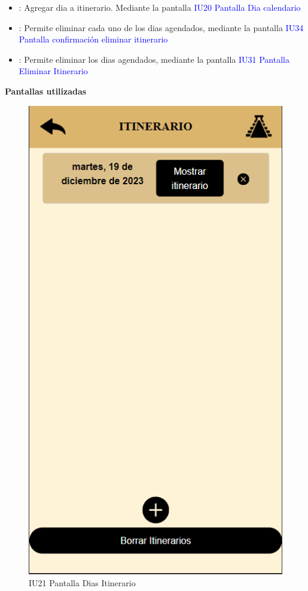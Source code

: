 \begin{itemize}
    \item \fbox{+}: Agregar dia a itinerario. Mediante la pantalla \textcolor{blue}{ IU20 Pantalla Dia calendario}
    
    \item {}: Permite eliminar cada uno de los dias agendados, mediante la pantalla \textcolor{blue}{IU34 Pantalla confirmación eliminar itinerario}
    \item {}: Permite eliminar los dias agendados, mediante la pantalla \textcolor{blue}{ IU31 Pantalla Eliminar Itinerario}
\end{itemize}

\textbf{Pantallas utilizadas}
\begin{figure}[htbp]
    \centering 
        \includegraphics[width=.5\linewidth]{entregable final/pantallasSistema/IU21 Pantalla Dias Itinerario.png}
    \caption{IU21 Pantalla Dias Itinerario}
        \label{fig:enter-label}
\end{figure}

